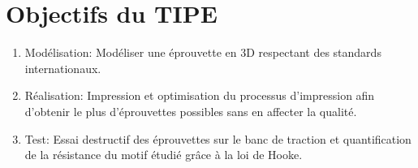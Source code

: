 \documentclass[12pt, french]{article}
\begin{document}
\section*{Objectifs du TIPE}
\begin{enumerate}
	\item	Modélisation: Modéliser une éprouvette en 3D respectant des standards internationaux.
    \item	Réalisation: Impression et optimisation du processus d’impression afin d’obtenir le plus d’éprouvettes possibles sans en affecter la qualité.
    \item	Test: Essai destructif des éprouvettes sur le banc de traction et quantification de la résistance du motif étudié grâce à la loi de Hooke.
\end{enumerate}




\cite{sports}
\cite{miami}
\cite{infill}
\cite{tensiletestd638}
\cite{ASTMD638}
\cite{rdm}
\end{document}
